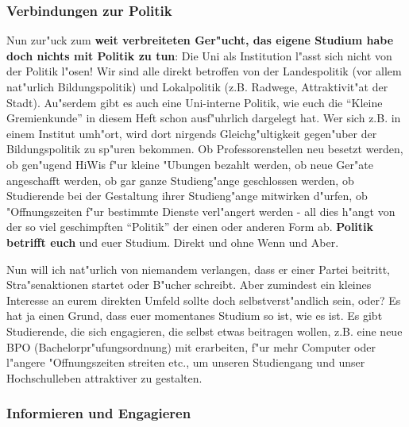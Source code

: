 \subsubsection*{Verbindungen zur Politik}

Nun zur"uck zum \textbf{weit verbreiteten Ger"ucht, das eigene Studium habe 
doch nichts mit Politik zu tun}: Die Uni als Institution l"asst sich nicht von 
der Politik l"osen! Wir sind alle direkt betroffen von der Landespolitik (vor 
allem nat"urlich Bildungspolitik) und Lokalpolitik (z.B. Radwege, 
Attraktivit"at der Stadt). Au"serdem gibt es auch eine Uni-interne Politik, wie 
euch die "`Kleine Gremienkunde"' in diesem Heft schon ausf"uhrlich dargelegt 
hat. Wer sich z.B. in einem Institut umh"ort, wird dort nirgends 
Gleichg"ultigkeit gegen"uber der Bildungspolitik zu sp"uren bekommen. Ob 
Professorenstellen neu besetzt werden, ob gen"ugend HiWis f"ur kleine "Ubungen 
bezahlt werden, ob neue Ger"ate angeschafft werden, ob gar ganze Studieng"ange 
geschlossen werden, ob Studierende bei der Gestaltung ihrer Studieng"ange 
mitwirken d"urfen, ob "Offnungszeiten f"ur bestimmte Dienste verl"angert werden 
- all dies h"angt von der so viel geschimpften "`Politik"' der einen oder 
anderen Form ab. \textbf{Politik betrifft euch} und euer Studium. Direkt und 
ohne Wenn und Aber.

Nun will ich nat"urlich von niemandem verlangen, dass er einer Partei beitritt, 
Stra"senaktionen startet oder B"ucher schreibt. Aber zumindest ein kleines 
Interesse an eurem direkten Umfeld sollte doch selbstverst"andlich sein, oder? 
Es hat ja einen Grund, dass euer momentanes Studium so ist, wie es ist. Es gibt 
Studierende, die sich engagieren, die selbst etwas beitragen wollen, z.B. eine 
neue BPO (Bachelorpr"ufungsordnung) mit erarbeiten, f"ur mehr Computer oder 
l"angere "Offnungszeiten streiten etc., um unseren Studiengang und unser 
Hochschulleben attraktiver zu gestalten.

\subsubsection*{Informieren und Engagieren}

